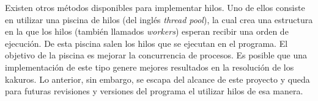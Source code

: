 \documentclass[conference]{IEEEtran}
\begin{document}
    Existen otros métodos disponibles para implementar  hilos. Uno de ellos consiste en utilizar una piscina de hilos (del inglés \textit{thread pool}), la cual crea una estructura en la que los hilos (también llamados \textit{workers}) esperan recibir una orden de ejecución. De esta piscina salen los hilos que se ejecutan en el programa. El objetivo de la piscina es mejorar la concurrencia de procesos. Es posible que una implementación de este tipo genere mejores resultados en la resolución de los kakuros. Lo anterior, sin embargo, se escapa del alcance de este proyecto y queda para futuras revisiones y versiones del programa el utilizar hilos de esa manera.\newline



    


\end{document}
